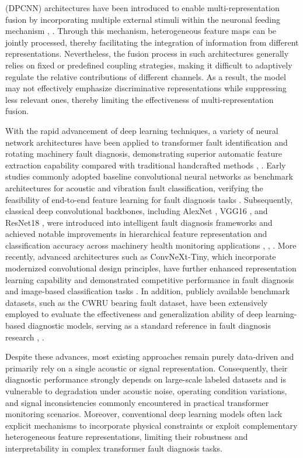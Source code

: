 \documentclass[anonymous]{iopjournal}
\begin{document}
(DPCNN) architectures have been introduced to enable multi-representation fusion by incorporating multiple external stimuli within the neuronal feeding mechanism \cite{4344292}, \cite{10341267}. Through this mechanism, heterogeneous feature maps can be jointly processed, thereby facilitating the integration of information from different representations. Nevertheless, the fusion process in such architectures generally relies on fixed or predefined coupling strategies, making it difficult to adaptively regulate the relative contributions of different channels. As a result, the model may not effectively emphasize discriminative representations while suppressing less relevant ones, thereby limiting the effectiveness of multi-representation fusion.

With the rapid advancement of deep learning techniques, a variety of neural network architectures have been applied to transformer fault identification and rotating machinery fault diagnosis, demonstrating superior automatic feature extraction capability compared with traditional handcrafted methods \cite{18184994}, \cite{7033433}. Early studies commonly adopted baseline convolutional neural networks as benchmark architectures for acoustic and vibration fault classification, verifying the feasibility of end-to-end feature learning for fault diagnosis tasks \cite{ahsanEnhancedFaultDiagnosis2025}. Subsequently, classical deep convolutional backbones, including AlexNet \cite{guNovelFaultDiagnosis2022}, VGG16 \cite{zhangFaultDiagnosisRecognition2024}, and ResNet18 \cite{maBearingFaultDiagnosis2024}, were introduced into intelligent fault diagnosis frameworks and achieved notable improvements in hierarchical feature representation and classification accuracy across machinery health monitoring applications \cite{11014495}, \cite{5352306}, \cite{4717246}. More recently, advanced architectures such as ConvNeXt-Tiny, which incorporate modernized convolutional design principles, have further enhanced representation learning capability and demonstrated competitive performance in fault diagnosis and image-based classification tasks \cite{zhangWaveConvNeXtEfficientPrecise2024}. In addition, publicly available benchmark datasets, such as the CWRU bearing fault dataset, have been extensively employed to evaluate the effectiveness and generalization ability of deep learning-based diagnostic models, serving as a standard reference in fault diagnosis research \cite{alonso-gonzalezBearingFaultDiagnosis2023}, \cite{zhangMachineLearningBased2021}.

Despite these advances, most existing approaches remain purely data-driven and primarily rely on a single acoustic or signal representation. Consequently, their diagnostic performance strongly depends on large-scale labeled datasets and is vulnerable to degradation under acoustic noise, operating condition variations, and signal inconsistencies commonly encountered in practical transformer monitoring scenarios. Moreover, conventional deep learning models often lack explicit mechanisms to incorporate physical constraints or exploit complementary heterogeneous feature representations, limiting their robustness and interpretability in complex transformer fault diagnosis tasks.
\end{document}

